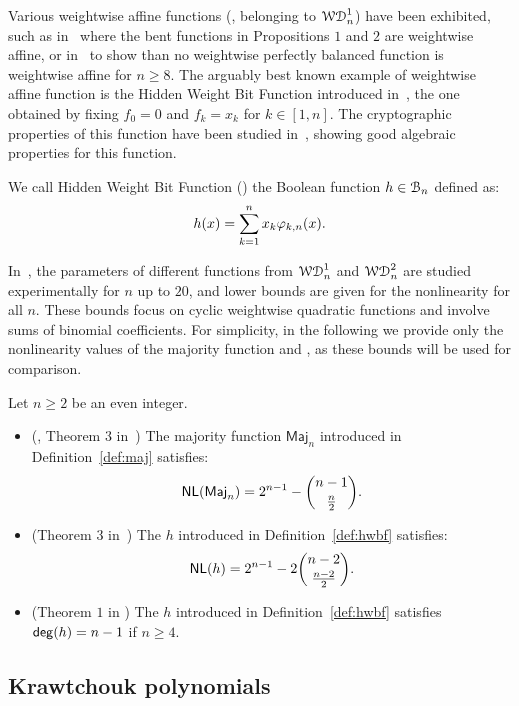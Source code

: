 \documentclass[11pt]{llncs}
\begin{document}
Various weightwise affine functions (\ie, belonging to $\mathcal{WD}^{1}_{n}$) have been exhibited, such as in~\cite{TOSC:CarMeaRot17} where the bent functions in Propositions $1$ and $2$ are weightwise affine, or in~\cite{DAM:GinMea22} to show than no weightwise perfectly balanced function is weightwise affine for $n\geq 8$. 
The arguably best known example of weightwise affine function is the Hidden Weight Bit Function introduced in~\cite{IEEE:Bryant91}, the one obtained by fixing $f_0=0$ and $f_k=x_k$ for $k \in [1,n]$. The cryptographic properties of this function have been studied in~\cite{DAM:WCST14}, showing good algebraic properties for this function.

\begin{definition}\label{def:hwbf}
    We call Hidden Weight Bit Function (\hwbf{}) the Boolean function $h\in\mathcal{B}_n$ defined as:
	\[
		h(x)=\sum_{k=1}^{n}x_k\varphi_{k,n}(x).
	\]
\end{definition}

In~\cite{DAM:MeaOza24}, the parameters of different functions from $\mathcal{WD}^{1}_{n}$ and $\mathcal{WD}^{2}_{n}$ are studied experimentally for $n$ up to $20$, and lower bounds are given for the nonlinearity for all $n$. 
These bounds focus on cyclic weightwise quadratic functions and involve sums of binomial coefficients. For simplicity, in the following we provide only the nonlinearity values of the majority function and \hwbf{}, as these bounds will be used for comparison.

\begin{Prop}\label{prop:wwd1}
	Let $n\geq 2$ be an even integer.
	\begin{itemize}
		\item (\eg, Theorem $3$ in~\cite{DCC:DalMaiSar06}) The majority function $\mathsf{Maj}_n$ introduced in Definition~\ref{def:maj} satisfies:
		\[
			\mathsf{NL}(\mathsf{Maj}_n)=2^{n-1}-\binom{n-1}{\frac n2}.
		\]
		\item (Theorem $3$ in~\cite{DAM:WCST14}) The \hwbf{} $h$ introduced in Definition~\ref{def:hwbf} satisfies:
		\[
			\mathsf{NL}(h)=2^{n-1}-2\binom{n-2}{\frac{n-2}{2}}.
		\]	
		\item (Theorem $1$ in \cite{DAM:WCST14}) The \hwbf{} $h$ introduced in Definition~\ref{def:hwbf} satisfies $\mathsf{deg}(h)=n-1$ if $n\geq 4$.
	\end{itemize}
\end{Prop}

\subsection{Krawtchouk polynomials}
\end{document}
